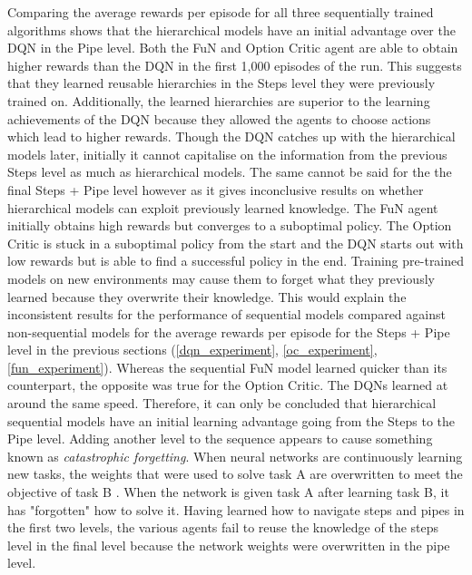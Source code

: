 \documentclass[notitlepage,a4paper,11pt]{article}
\begin{document}
Comparing the average rewards per episode for all three sequentially trained algorithms shows that the hierarchical models have an initial advantage over the DQN in the Pipe level. Both the FuN and Option Critic agent are able to obtain higher rewards than the DQN in the first 1,000 episodes of the run. This suggests that they learned reusable hierarchies in the Steps level they were previously trained on. Additionally, the learned hierarchies are superior to the learning achievements of the DQN because they allowed the agents to choose actions which lead to higher rewards. Though the DQN catches up with the hierarchical models later, initially it cannot capitalise on the information from the previous Steps level as much as hierarchical models. The same cannot be said for the the final Steps + Pipe level however as it gives inconclusive results on whether hierarchical models can exploit previously learned knowledge. The FuN agent initially obtains high rewards but converges to a suboptimal policy. The Option Critic is stuck in a suboptimal policy from the start and the DQN starts out with low rewards but is able to find a successful policy in the end. Training pre-trained models on new environments may cause them to forget what they previously learned because they overwrite their knowledge. This would explain the inconsistent results for the performance of sequential models compared against non-sequential models for the average rewards per episode for the Steps + Pipe level in the previous sections (\ref{dqn_experiment}, \ref{oc_experiment}, \ref{fun_experiment}). Whereas the sequential FuN model learned quicker than its counterpart, the opposite was true for the Option Critic. The DQNs learned at around the same speed. Therefore, it can only be concluded that hierarchical sequential models have an initial learning advantage going from the Steps to the Pipe level. Adding another level to the sequence appears to cause something known as \textit{catastrophic forgetting}. When neural networks are continuously learning new tasks, the weights that were used to solve task A are overwritten to meet the objective of task B \cite{kirkpatrick2017overcoming}. When the network is given task A after learning task B, it has "forgotten" how to solve it. Having learned how to navigate steps and pipes in the first two levels, the various agents fail to reuse the knowledge of the steps level in the final level because the network weights were overwritten in the pipe level.
\end{document}
